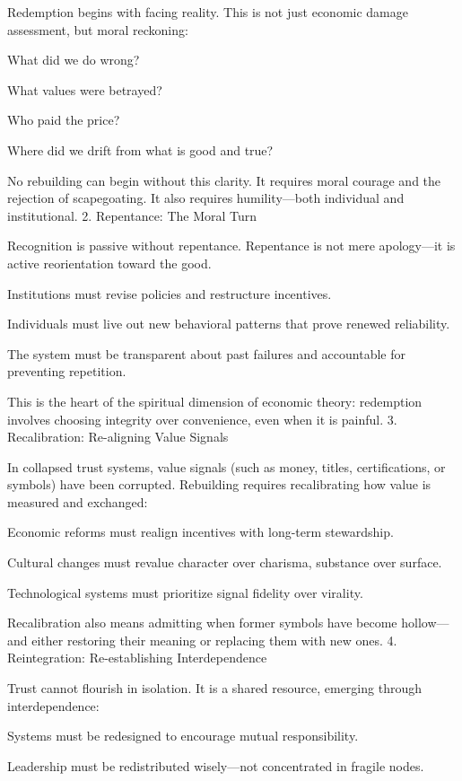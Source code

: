 \documentclass[11pt,oneside]{book}
\begin{document}
Redemption begins with facing reality. This is not just economic damage assessment, but moral reckoning:

    What did we do wrong?

    What values were betrayed?

    Who paid the price?

    Where did we drift from what is good and true?

No rebuilding can begin without this clarity. It requires moral courage and the rejection of scapegoating. It also requires humility—both individual and institutional.
2. Repentance: The Moral Turn

Recognition is passive without repentance. Repentance is not mere apology—it is active reorientation toward the good.

    Institutions must revise policies and restructure incentives.

    Individuals must live out new behavioral patterns that prove renewed reliability.

    The system must be transparent about past failures and accountable for preventing repetition.

This is the heart of the spiritual dimension of economic theory: redemption involves choosing integrity over convenience, even when it is painful.
3. Recalibration: Re-aligning Value Signals

In collapsed trust systems, value signals (such as money, titles, certifications, or symbols) have been corrupted. Rebuilding requires recalibrating how value is measured and exchanged:

    Economic reforms must realign incentives with long-term stewardship.

    Cultural changes must revalue character over charisma, substance over surface.

    Technological systems must prioritize signal fidelity over virality.

Recalibration also means admitting when former symbols have become hollow—and either restoring their meaning or replacing them with new ones.
4. Reintegration: Re-establishing Interdependence

Trust cannot flourish in isolation. It is a shared resource, emerging through interdependence:

    Systems must be redesigned to encourage mutual responsibility.

    Leadership must be redistributed wisely—not concentrated in fragile nodes.
\end{document}
